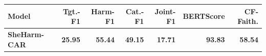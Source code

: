 \begin{tabular}{lrrrrrr}
\toprule
\textbf{Model} & \textbf{Tgt.-F1} & \textbf{Harm-F1} & \textbf{Cat.-F1} & \textbf{Joint-F1} & \textbf{BERTScore} & \textbf{CF-Faith.} \\
\midrule
\textbf{SheHarm-CAR} & \textbf{25.95} & \textbf{55.44} & \textbf{49.15} & \textbf{17.71} & \textbf{93.83} & \textbf{58.54} \\
\bottomrule
\end{tabular}
